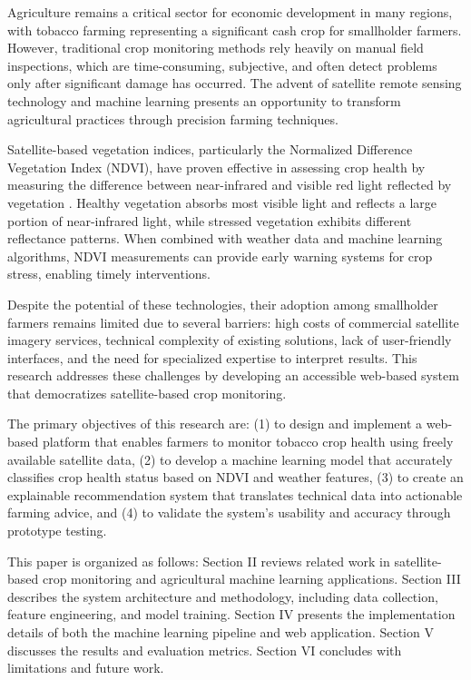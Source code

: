 \documentclass[journal]{IEEEtran}
\begin{document}
Agriculture remains a critical sector for economic development in many regions, with tobacco farming representing a significant cash crop for smallholder farmers. However, traditional crop monitoring methods rely heavily on manual field inspections, which are time-consuming, subjective, and often detect problems only after significant damage has occurred. The advent of satellite remote sensing technology and machine learning presents an opportunity to transform agricultural practices through precision farming techniques.

Satellite-based vegetation indices, particularly the Normalized Difference Vegetation Index (NDVI), have proven effective in assessing crop health by measuring the difference between near-infrared and visible red light reflected by vegetation \cite{rouse1974monitoring}. Healthy vegetation absorbs most visible light and reflects a large portion of near-infrared light, while stressed vegetation exhibits different reflectance patterns. When combined with weather data and machine learning algorithms, NDVI measurements can provide early warning systems for crop stress, enabling timely interventions.

Despite the potential of these technologies, their adoption among smallholder farmers remains limited due to several barriers: high costs of commercial satellite imagery services, technical complexity of existing solutions, lack of user-friendly interfaces, and the need for specialized expertise to interpret results. This research addresses these challenges by developing an accessible web-based system that democratizes satellite-based crop monitoring.

The primary objectives of this research are: (1) to design and implement a web-based platform that enables farmers to monitor tobacco crop health using freely available satellite data, (2) to develop a machine learning model that accurately classifies crop health status based on NDVI and weather features, (3) to create an explainable recommendation system that translates technical data into actionable farming advice, and (4) to validate the system's usability and accuracy through prototype testing.

This paper is organized as follows: Section II reviews related work in satellite-based crop monitoring and agricultural machine learning applications. Section III describes the system architecture and methodology, including data collection, feature engineering, and model training. Section IV presents the implementation details of both the machine learning pipeline and web application. Section V discusses the results and evaluation metrics. Section VI concludes with limitations and future work.
\end{document}
